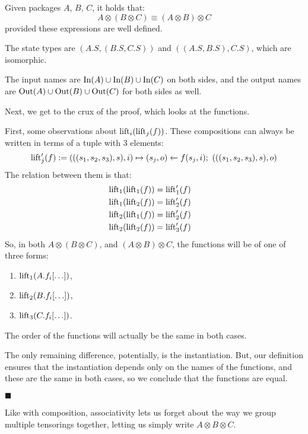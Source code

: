 \begin{lemma}
    Given packages $A$, $B$, $C$, it holds that:
    $$
    A \otimes (B \otimes C) \equiv (A \otimes B) \otimes C
    $$
    provided these expressions are well defined.

     The state types are $(A.S, (B.S, C.S))$
    and $((A.S, B.S), C.S)$, which are isomorphic.

    The input names are $\text{In}(A) \cup \text{In}(B) \cup \text{In}(C)$
    on both sides,
    and the output names are $\text{Out}(A) \cup \text{Out}(B) \cup \text{Out}(C)$
    for both sides as well.

    Next, we get to the crux of the proof, which looks at the functions.

    First, some observations about $\text{lift}_{i}(\text{lift}_j(f))$.
    These compositions can always be written in terms of a tuple with
    3 elements:
    $$
    \text{lift}'_j(f) := (((s_1, s_2, s_3), s), i) \mapsto (s_j, o) \gets f(s_j, i);\ (((s_1, s_2, s_3), s), o)
    $$
    The relation between them is that:
    $$
    \begin{aligned}
    &\text{lift}_1(\text{lift}_1(f)) = \text{lift}'_1(f)\cr
    &\text{lift}_1(\text{lift}_2(f)) = \text{lift}'_2(f)\cr
    &\text{lift}_2(\text{lift}_1(f)) = \text{lift}'_2(f)\cr
    &\text{lift}_2(\text{lift}_2(f)) = \text{lift}'_3(f)\cr
    \end{aligned}
    $$
    So, in both $A \otimes (B \otimes C)$, and $(A \otimes B) \otimes C$, the functions will be of one of three forms:
    \begin{enumerate}
        \item $\text{lift}_1(A.f_i[\ldots])$,
        \item $\text{lift}_2(B.f_i[\ldots])$,
        \item $\text{lift}_3(C.f_i[\ldots])$.
    \end{enumerate}

    The order of the functions will actually be the same in both cases.

    The only remaining difference, potentially, is the instantiation.
    But, our definition ensures that the instantiation depends only on the names
    of the functions, and these are the same in both cases,
    so we conclude that the functions are equal.

    $\blacksquare$
\end{lemma}

Like with composition, associativity lets us forget about the way we
group multiple tensorings together, letting us simply write $A \otimes B \otimes C$.

